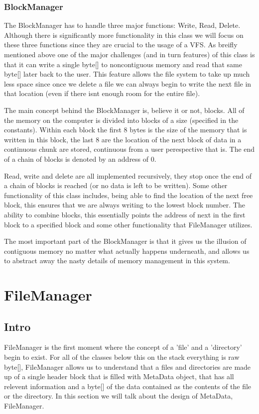 \documentclass[12pt]{article}
\begin{document}
\subsubsection{BlockManager}
The BlockManager has to handle three major functions: Write, Read, Delete.  Although there is significantly more functionality in this class we will focus on these three functions since they are crucial to the usage of a VFS.  As breifly mentioned above one of the major challenges (and in turn features) of this class is that it can write a single byte[] to noncontiguous memory and read that same byte[] later back to the user.  This feature allows the file system to take up much less space since once we delete a file we can always begin to write the next file in that location (even if there isnt enough room for the entire file).

The main concept behind the BlockManager is, believe it or not, blocks.  All of the memory on the computer is divided into blocks of a size (specified in the constants).  Within each block the first 8 bytes is the size of the memory that is written in this block, the last 8 are the location of the next block of data in a continuous chunk are stored, continuous from a user perespective that is.  The end of a chain of blocks is denoted by an address of 0.

Read, write and delete are all implemented recursively, they stop once the end of a chain of blocks is reached (or no data is left to be written).  Some other functionality of this class includes, being able to find the location of the next free block, this ensures that we are always writing to the lowest block number.  The ability to combine blocks, this essentially points the address of next in the first block to a specified block and some other functionality that FileManager utilizes.

The most important part of the BlockManager is that it gives us the illusion of contiguous memory no matter what actually happens underneath, and allows us to abstract away the nasty details of memory management in this system.

\section{FileManager}
\subsection{Intro}
FileManager is the first moment where the concept of a 'file' and a 'directory' begin to exist.  For all of the classes below this on the stack everything is raw byte[], FileManager allows us to understand that a files and directories are made up of a single header block that is filled with MetaData object, that has all relevent information and a byte[] of the data contained as the contents of the file or the directory.  In this section we will talk about the design of MetaData, FileManager.
\end{document}
